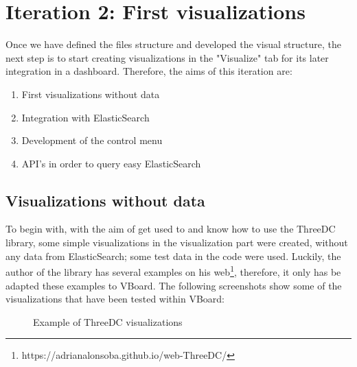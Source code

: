 \documentclass[a4paper, 12pt]{book}
\begin{document}
\section{Iteration 2: First visualizations}

Once we have defined the files structure and developed the visual structure, the next step is to start creating visualizations in the "Visualize" tab for its later integration in a dashboard. Therefore, the aims of this iteration are:

\begin{enumerate}
\item First visualizations without data
\item Integration with ElasticSearch
\item Development of the control menu
\item API's in order to query easy ElasticSearch
\end{enumerate}

\subsection{Visualizations without data}

To begin with, with the aim of get used to and know how to use the ThreeDC library, some simple visualizations in the visualization part were created, without any data from ElasticSearch; some test data in the code were used. Luckily, the author of the library has several examples on his web\footnote{https://adrianalonsoba.github.io/web-ThreeDC/}, therefore, it only has be adapted these examples to VBoard. The following screenshots show some of the visualizations that have been tested within VBoard:



\begin{figure}[H]
 \centering
 \caption{Example of ThreeDC visualizations}
 \label{f:threedcexamples}
\end{figure}
\end{document}
